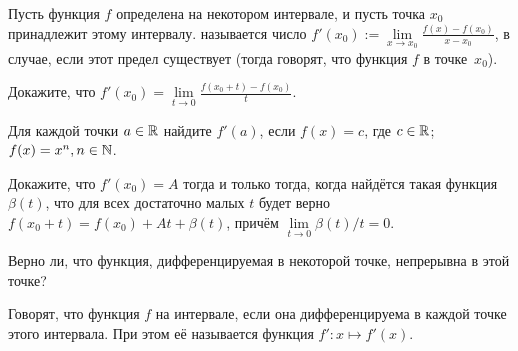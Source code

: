 \documentclass[a4paper,12pt]{article}
\begin{document}





Пусть функция $f$ определена на некотором интервале, и пусть точка $x_0$
принадлежит этому интервалу.
 называется число
$f'(x_0):=\lim\limits_{x\to x_0}\frac{f(x)-f(x_0)}{x-x_0}$,
в случае, если этот предел существует (тогда говорят, что функция $f$
 в точке~$x_0$).

 Докажите, что
$f'(x_0)=\lim\limits_{t\to 0}\frac{f(x_0+t)-f(x_0)}{t}$.

Для каждой точки $a\in\mathbb{R}$ найдите $f'(a)$, если
 $f(x)=c$, где $c\in\mathbb{R}$;
 $f(x)=x^n, n\in \mathbb{N}$.

 Докажите, что $f'(x_0)=A$
тогда и только тогда, когда найд\"ется такая функция $\beta(t)$, что
для всех достаточно малых $t$ будет верно
$f(x_0+t)=f(x_0)+At+\beta(t)$,
прич\"ем $\lim\limits_{t\to0}\beta(t)/t=0$.


Верно ли, что функция, дифференцируемая в некоторой точке,
непрерывна в этой точке? %



 Говорят, что функция $f$  на интервале,
если она дифференцируема в каждой точке этого интервала. При этом
е\"е  называется функция $f':x\mapsto f'(x)$.
\end{document}

